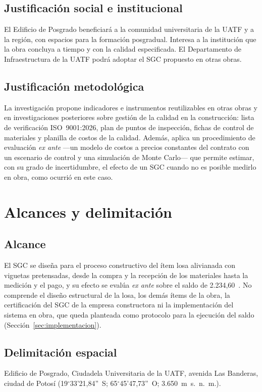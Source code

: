 \subsection{Justificación social e institucional}
El Edificio de Posgrado beneficiará a la comunidad universitaria de la UATF y a la región, con espacios para la formación posgradual. Interesa a la institución que la obra concluya a tiempo y con la calidad especificada. El Departamento de Infraestructura de la UATF podrá adoptar el SGC propuesto en otras obras.

\subsection{Justificación metodológica}
La investigación propone indicadores e instrumentos reutilizables en otras obras y en investigaciones posteriores sobre gestión de la calidad en la construcción: lista de verificación ISO~9001:2026, plan de puntos de inspección, fichas de control de materiales y planilla de costos de la calidad. Además, aplica un procedimiento de evaluación \emph{ex ante} ---un modelo de costos a precios constantes del contrato con un escenario de control y una simulación de Monte Carlo--- que permite estimar, con su grado de incertidumbre, el efecto de un SGC cuando no es posible medirlo en obra, como ocurrió en este caso.

\section{Alcances y delimitación}

\subsection{Alcance}
El SGC se diseña para el proceso constructivo del ítem losa alivianada con viguetas pretensadas, desde la compra y la recepción de los materiales hasta la medición y el pago, y su efecto se evalúa \emph{ex ante} sobre el saldo de 2.234,60~\mdos{}. No comprende el diseño estructural de la losa, los demás ítems de la obra, la certificación del SGC de la empresa constructora ni la implementación del sistema en obra, que queda planteada como protocolo para la ejecución del saldo (Sección~\ref{sec:implementacion}).

\subsection{Delimitación espacial}
Edificio de Posgrado, Ciudadela Universitaria de la UATF, avenida Las Banderas, ciudad de Potosí (19$^{\circ}$33'21,84''~S; 65$^{\circ}$45'47,73''~O; 3.650~m~s.~n.~m.).

